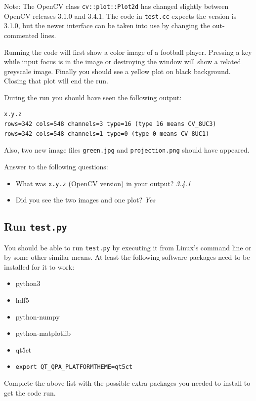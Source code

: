 \documentclass{article}
\begin{document}
Note: The OpenCV class \texttt{cv::plot::Plot2d} has changed slightly
between OpenCV releases 3.1.0 and 3.4.1.  The code in \texttt{test.cc}
expects the version is 3.1.0, but the newer interface can be taken
into use by changing the out-commented lines.

Running the code will first show a color image of a football player.
Pressing a key while input focus is in the image or destroying the
window will show a related greyscale image.  Finally you should see a
yellow plot on black background.  Closing that plot will end the run.

During the run you should have seen the following output:

\begin{verbatim}
x.y.z
rows=342 cols=548 channels=3 type=16 (type 16 means CV_8UC3)
rows=342 cols=548 channels=1 type=0 (type 0 means CV_8UC1)
\end{verbatim}

Also, two new image files \texttt{green.jpg} and
\texttt{projection.png} should have appeared.

Answer to the following questions:

\begin{itemize}
\item What was \texttt{x.y.z} (OpenCV version) in your output? \emph{3.4.1} 
\item Did you see the two images and one plot? \emph{Yes} 
\end{itemize}


\subsection{Run \texttt{test.py}}

You should be able to run \texttt{test.py} by executing it from
Linux's command line or by some other similar means.  At least the
following software packages need to be installed for it to work:

\begin{itemize}
\item python3
\item hdf5
\item python-numpy
\item python-matplotlib
\item qt5ct
\item \texttt{export QT\_QPA\_PLATFORMTHEME=qt5ct}
\end{itemize}
Complete the above list with the possible extra packages you needed
to install to get the code run.
\end{document}
